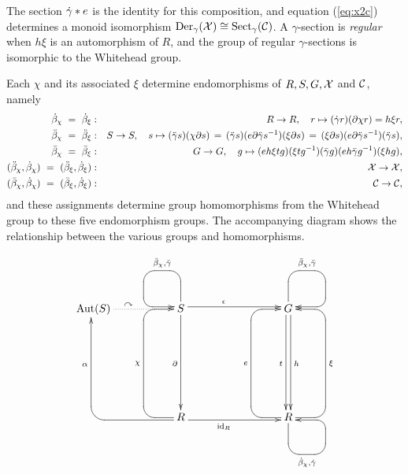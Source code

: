The section  $\dot{\gamma}*e$  is the identity for this composition,
and equation (\ref{eq:x2c}) determines a monoid isomorphism
$\mathrm{Der}_{\gamma}(\mathcal{X}) \cong \mathrm{Sect}_{\gamma}(\mathcal{C})$.
A $\gamma$-section is  \emph{regular}  when  $h \xi$  is an automorphism of $R$, 
and the group of regular $\gamma$-sections is isomorphic to the Whitehead group.

Each  $\chi$  and its associated  $\xi$  determine endomorphisms of  
$R, S, G, \mathcal{X}$ and $\mathcal{C}$, namely 
\begin{eqnarray} \label{eq:five-endos}
   \dot{\beta}_{\chi} ~=~ \dot{\beta}_{\xi}  &  :  &  R \to R, 
                  \quad  r \mapsto (\dot{\gamma} r)(\partial \chi r) = h \xi r,  
\nonumber \\
  \ddot{\beta}_{\chi} ~=~ \ddot{\beta}_{\xi}  &  :  &  S \to S,
                  \quad  s \mapsto (\ddot{\gamma} s)(\chi \partial s) \,
                      = \, (\ddot{\gamma} s)(e\partial\ddot{\gamma} s^{-1})(\xi \partial s) \, 
                      = \, (\xi \partial s)(e\partial\ddot{\gamma} s^{-1})(\ddot{\gamma} s), 
\nonumber \\
 \bar{\beta}_{\chi} ~=~ \bar{\beta}_{\xi}  &  :  &  G \to G,
                  \quad  g \mapsto (eh \xi tg)(\xi tg^{-1})
                           (\bar{\gamma} g)(eh \bar{\gamma} g^{-1})(\xi hg),  \\
  (\ddot{\beta}_{\chi}, \dot{\beta}_{\chi})  ~=~  (\ddot{\beta}_{\xi}, \dot{\beta}_{\xi}) 
    & : & \mathcal{X} \to \mathcal{X}, 
\nonumber \\
  (\bar{\beta}_{\chi}, \dot{\beta}_{\chi})  ~=~  (\bar{\beta}_{\xi}, \dot{\beta}_{\xi}) 
    & : & \mathcal{C} \to \mathcal{C}, 
\nonumber
\end{eqnarray}
and these assignments determine group homomorphisms from the
Whitehead group to these five endomorphism groups.
The accompanying diagram shows the relationship between the various 
groups and homomorphisms.

$$\xy
\xymatrix{
   &&&&&&  \\
  \Aut(S)  \ar @{.} [0,2]^(0.4){\curvearrowright}
    &&  S  \ar[rrr] <+0.5ex>^(0.4){\epsilon} 
           \ar[ddd] _{\partial}  
           \ar `u[ul] `[0,-1]_{\ddb_{\chi},\ddg} 
                          `[0,0]<+0.5ex> [0,0]<+0.5ex>
   &&&  G  \ar[ddd] <+0.5ex>^h  
           \ar[ddd] <-0.5ex>_t
           \ar `u[ur] `[r]^{\barb_{\chi},\barg} 
                      `[0,0]<-0.5ex> [0,0]<-0.5ex>
     &    \\
   &&&&&& \\
   &&&&&& \\
    &&  R  \ar `l [ll]<+0.5ex> [uuull]<+0.5ex>^(0.43){\alpha}
           \ar `l[uuul] `[uuu]^{\chi} [uuu]
           \ar[rrr] <-0.5ex>_(0.4){\id_R}
   &&&  R  \ar `l[uuul] `[uuu]^{e}   [uuu]
           \ar `r[uuur]  `[uuu]_{\xi} [uuu]
           \ar `d[dr] `[r]_{\db_{\chi},\dg} 
                      `[0,0]<+0.5ex> [0,0]<+0.5ex>
     &    \\ 
   &&&&&& \\ 
   &&&&&& \\
}
\endxy$$


